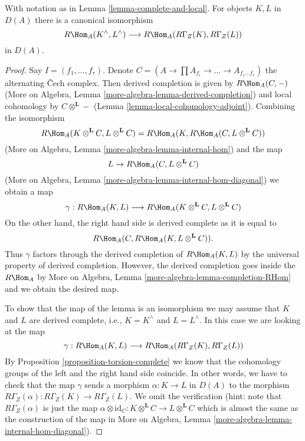 \begin{lemma}
\label{lemma-compare-RHom}
With notation as in Lemma \ref{lemma-complete-and-local}.
For objects $K, L$ in $D(A)$ there is a canonical isomorphism
$$
R\Hom_A(K^\wedge, L^\wedge) \longrightarrow R\Hom_A(R\Gamma_Z(K), R\Gamma_Z(L))
$$
in $D(A)$.
\end{lemma}

\begin{proof}
Say $I = (f_1, \ldots, f_r)$. Denote
$C = (A \to \prod A_{f_i} \to \ldots \to A_{f_1 \ldots f_r})$ the
alternating {\v C}ech complex. Then derived completion is given by
$R\Hom_A(C, -)$ (More on Algebra, Lemma
\ref{more-algebra-lemma-derived-completion}) and local cohomology by
$C \otimes^\mathbf{L} -$ (Lemma \ref{lemma-local-cohomology-adjoint}).
Combining the isomorphism
$$
R\Hom_A(K \otimes^\mathbf{L} C, L \otimes^\mathbf{L} C) =
R\Hom_A(K, R\Hom_A(C,  L \otimes^\mathbf{L} C))
$$
(More on Algebra, Lemma \ref{more-algebra-lemma-internal-hom})
and the map
$$
L \to R\Hom_A(C,  L \otimes^\mathbf{L} C)
$$
(More on Algebra, Lemma \ref{more-algebra-lemma-internal-hom-diagonal})
we obtain a map
$$
\gamma :
R\Hom_A(K, L)
\longrightarrow
R\Hom_A(K \otimes^\mathbf{L} C, L \otimes^\mathbf{L} C)
$$
On the other hand, the right hand side is derived complete as it is
equal to
$$
R\Hom_A(C, R\Hom_A(K, L \otimes^\mathbf{L} C)).
$$
Thus $\gamma$ factors through the derived completion of
$R\Hom_A(K, L)$ by the universal property of derived completion.
However, the derived completion goes inside the $R\Hom_A$ by
More on Algebra, Lemma \ref{more-algebra-lemma-completion-RHom}
and we obtain the desired map.

\medskip\noindent
To show that the map of the lemma is an isomorphism
we may assume that $K$ and $L$ are derived complete, i.e.,
$K = K^\wedge$ and $L = L^\wedge$. In this case we are
looking at the map
$$
\gamma : R\Hom_A(K, L) \longrightarrow R\Hom_A(R\Gamma_Z(K), R\Gamma_Z(L))
$$
By Proposition \ref{proposition-torsion-complete} we know that
the cohomology groups
of the left and the right hand side coincide. In other words,
we have to check that the map $\gamma$ sends a morphism
$\alpha : K \to L$ in $D(A)$ to the morphism
$R\Gamma_Z(\alpha) : R\Gamma_Z(K) \to R\Gamma_Z(L)$.
We omit the verification (hint: note that $R\Gamma_Z(\alpha)$
is just the map
$\alpha \otimes \text{id}_C :
K \otimes^\mathbf{L} C
\to
L \otimes^\mathbf{L} C$ which is almost the same as the
construction of the map in
More on Algebra, Lemma \ref{more-algebra-lemma-internal-hom-diagonal}).
\end{proof}

